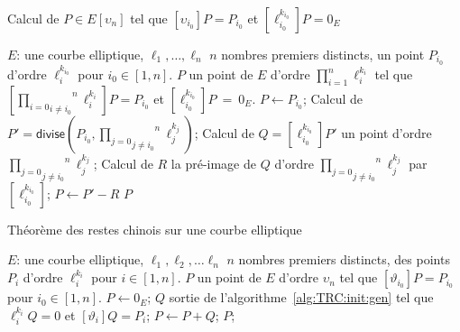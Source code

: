\documentclass[10pt,a4paper]{book}
\theoremstyle{plain}
\theoremstyle{definition}
\theoremstyle{definition}
\theoremstyle{definition}
\theoremstyle{definition}
\theoremstyle{remark}
\theoremstyle{remark}
\theoremstyle{definition}
\begin{document}
\begin{algorithm}
\caption{ \label{alg:TRC:init:gen}  Calcul de $P \in E[\upsilon_n]$ tel que 
$[\upsilon_{i_0}]P=P_{i_0}$ 
et $[\ell_{i_0}^{k_{i_0}}]P=0_E$}
\begin{algorithmic}[1]
\REQUIRE $E$: une courbe elliptique, $\ell_1, \dots, \ell_n$ $n$ nombres premiers distincts, un point $P_{i_0}$ d'ordre $\ell_i^{k_{i_0}}$ pour $i_0 \in [1,n]$.
\ENSURE $P$ un point de $E$ d'ordre $\prod_{i=1}^n \ell_i^{k_i}$  tel que $[\overset{n}{\underset{i \neq i_0}{\underset{i = 0}{\prod}}}\ell_i^{k_i} ]P=P_{i_0}$ et $[\ell_{i_0}^{k_{i_0}}]P~=~0_E$.
\STATE $P \leftarrow P_{i_0}$;
\STATE \label{alg:TRC:init:gen:div} Calcul de $P'=\mathsf{divise}(P_{i_0},\overset{n}{\underset{j \neq i_0}{\underset{j = 0}{\prod}}}\ell_j^{k_j})$;
\STATE \label{alg:TRC:init:gen:mul} Calcul de $Q=[\ell_{i_0}^{k_{i_0}}]P'$ un point d'ordre $\overset{n}{\underset{j \neq i_0}{\underset{j = 0}{\prod}}}\ell_j^{k_j}$;
\STATE \label{alg:TRC:init:gen:prim} Calcul de $R$ la pré-image de $Q$ d'ordre $\overset{n}{\underset{j \neq i_0}{\underset{j = 0}{\prod}}}\ell_j^{k_j}$ par $[\ell_{i_0}^{k_{i_0}}]$;
\STATE \label{alg:TRC:init:gen:add}$P \leftarrow P'-R$
\RETURN $P$
\end{algorithmic}
\end{algorithm}

\begin{algorithm}
\caption{\label{alg:TRC} Théorème des restes chinois sur une courbe elliptique}
\begin{algorithmic}[1]
\REQUIRE $E$: une courbe elliptique, $\ell_1,\ell_2, \dots \ell_n$ $n$ nombres premiers distincts, des points $P_i$ d'ordre $\ell_i^{k_i}$ pour $i \in [1,n]$.
\ENSURE $P$ un point de $E$ d'ordre $\upsilon_n$  tel que $[\vartheta_{i_0} ] P=P_{i_0}$ pour $i_0 \in [1,n]$.
\STATE $P \leftarrow 0_E$;
\STATE $Q$ sortie de l'algorithme~\ref{alg:TRC:init:gen} tel que $\ell_i^{k_i}Q=0$ et $[\vartheta_i]Q=P_i$;
\STATE $P \leftarrow P+Q$; 
\ENDFOR
\RETURN $P$;
\end{algorithmic}
\end{algorithm}
\end{document}
